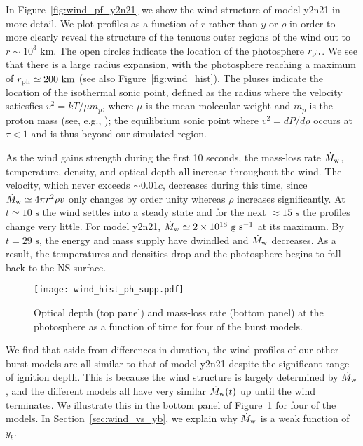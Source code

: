 \documentclass[apj,usenatbib, iop, twocolappendix]{emulateapj}
\newcommand{\Mdot}{\dot{M}_{\rm w}}
\newcommand{\nevin}[1]{\textcolor{red}{#1}}
\newcommand{\trm}[1]{\textrm{#1}}
\begin{document}
In Figure~\ref{fig:wind_pf_y2n21} we show the wind structure of model y2n21 in more detail.  We plot profiles as a function of $r$ rather than $y$ or $\rho$ in order to more clearly reveal the structure of the tenuous outer regions of the wind out to $r\sim 10^3\trm{ km}$. The open circles indicate the location of the photosphere $r_{\rm ph}$.  We see that there is a large radius expansion, with the photosphere reaching a maximum of $r_{\rm ph}\simeq 200\trm{ km}$ (see also Figure~\ref{fig:wind_hist}). The pluses indicate the location of the isothermal sonic point, defined as the radius where the velocity satiesfies $v^2=kT/\mu m_p$, where $\mu$ is the mean molecular weight and $m_p$ is the proton mass (see, e.g., \citealt{Quinn:85, Joss:87}); the equilibrium sonic point where $v^2=dP/d\rho$ occurs at $\tau < 1$ and is thus beyond our simulated region. 

As the wind gains strength during the first 10 seconds, the mass-loss rate $\Mdot$, temperature, density, and optical depth all increase throughout the wind.  The velocity, which never exceeds $\sim 0.01c$,  decreases during this time, since $\Mdot\simeq 4\pi r^2\rho v$ only changes by order unity whereas $\rho$ increases significantly. At $t\simeq10\trm{ s}$ the wind settles into a steady state and for the next $\approx 15\trm{ s}$ the profiles change very little. For model y2n21, $\Mdot\simeq 2\times10^{18}\trm{ g s}^{-1}$ at its maximum. By $t=29\trm{ s}$, the energy and mass supply have dwindled and $\Mdot$  decreases.  As a result, the temperatures and densities drop and the photosphere begins to fall back to the NS  surface.  

\begin{figure}
\texttt{[image: wind\_hist\_ph\_supp.pdf]}
\caption{Optical depth (top panel) and mass-loss rate (bottom panel) at the photosphere as a function of time for four of the burst models.}
\label{fig:wind_hist_ph_supp}
\end{figure}

We find that aside from differences in duration, the wind profiles of our other burst models are all similar to that of model y2n21 despite the  significant range of ignition depth.  This is because the wind structure is largely determined by $\Mdot$  \citep{Kato:83, Quinn:85, Paczynski:86}, and the different models all have very similar $\Mdot(t)$ up until the wind terminates.  We illustrate this in the bottom panel of Figure~\ref{fig:wind_hist_ph_supp} for four of the models.  In Section~\ref{sec:wind_vs_yb}, we explain why $\Mdot$ is a weak function of $y_b$.
\end{document}
